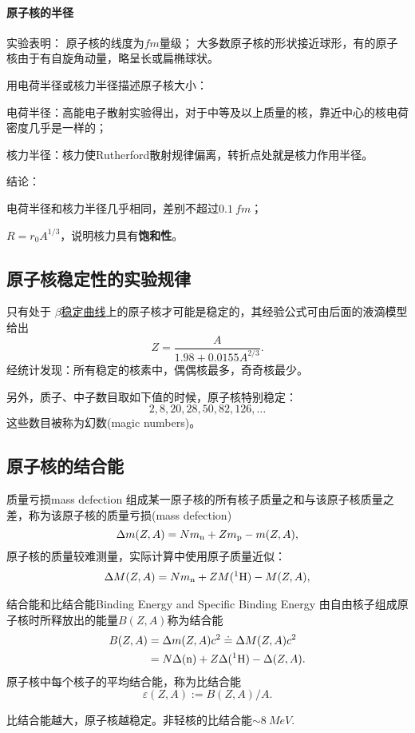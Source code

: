 \paragraph{原子核的半径}
实验表明：
原子核的线度为$\si{fm}$量级；
大多数原子核的形状接近球形，有的原子核由于有自旋角动量，略呈长或扁椭球状。

用电荷半径或核力半径描述原子核大小：
\begin{compactitem}
	\item 电荷半径：高能电子散射实验得出，对于中等及以上质量的核，靠近中心的核电荷密度几乎是一样的；
	\item 核力半径：核力使Rutherford散射规律偏离，转折点处就是核力作用半径。
\end{compactitem}
结论：
\begin{compactenum}
	\item 电荷半径和核力半径几乎相同，差别不超过$\SI{0.1}{fm}$；
	\item $R=r_0A^{1/3}$，说明核力具有\textbf{饱和性}。
\end{compactenum}

\subsection{原子核稳定性的实验规律}
只有处于
\href{https://www.nndc.bnl.gov/nudat3/}{$\beta$稳定曲线}上的原子核才可能是稳定的，其经验公式可由后面的液滴模型给出
\[
	Z=\frac A{1.98 + 0.0155A^{2/3}}.
\]
经统计发现：所有稳定的核素中，偶偶核最多，奇奇核最少。

另外，质子、中子数目取如下值的时候，原子核特别稳定：
\[
	2,8,20,28,50,82,126,\ldots
\]
这些数目被称为幻数(magic numbers)。

\subsection{原子核的结合能}
\begin{definition}{质量亏损}{mass defection}
	组成某一原子核的所有核子质量之和与该原子核质量之差，称为该原子核的质量亏损(mass defection)
	\[
		\Delta m(Z,A)=Nm_\mathrm n+Zm_\mathrm p-m(Z,A),
	\]
	原子核的质量较难测量，实际计算中使用原子质量近似：
	\begin{align}
		\Delta M(Z,A)=Nm_\mathrm n+ZM({^{1}\mathrm{H}})-M(Z,A),
	\end{align}
\end{definition}
\begin{definition}{结合能和比结合能}{Binding Energy and Specific Binding Energy}
	由自由核子组成原子核时所释放出的能量$B(Z,A)$称为结合能
	\begin{align}\notag
		B(Z,A)&=\Delta m(Z,A)c^2\doteq\Delta M(Z,A)c^2\\
		&=N\Delta(\mathrm n)+Z\Delta({^{1}\mathrm{H}})-\Delta(Z,A).
	\end{align}
	原子核中每个核子的平均结合能，称为比结合能
	\[
		\varepsilon(Z,A):=B(Z,A)/A.
	\]
\end{definition}
比结合能越大，原子核越稳定。非轻核的比结合能$\sim\SI{8}{MeV}$.
